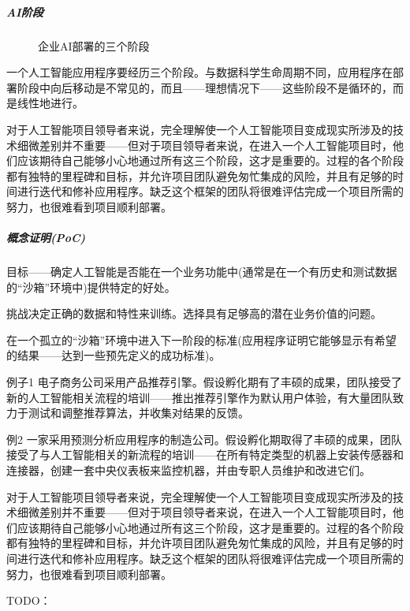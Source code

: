 \documentclass[letterpaper,10pt,english]{sphinxmanual}
\begin{document}
\subparagraph{AI阶段}
\label{\detokenize{chapter_knowledge/project_manage:id17}}
\begin{figure}[H]
\centering
\capstart

\noindent{}
\caption{企业AI部署的三个阶段}\label{\detokenize{chapter_knowledge/project_manage:id23}}\end{figure}

一个人工智能应用程序要经历三个阶段。与数据科学生命周期不同，应用程序在部署阶段中向后移动是不常见的，而且——理想情况下——这些阶段不是循环的，而是线性地进行。

对于人工智能项目领导者来说，完全理解使一个人工智能项目变成现实所涉及的技术细微差别并不重要——但对于项目领导者来说，在进入一个人工智能项目时，他们应该期待自己能够小心地通过所有这三个阶段，这才是重要的。过程的各个阶段都有独特的里程碑和目标，并允许项目团队避免匆忙集成的风险，并且有足够的时间进行迭代和修补应用程序。缺乏这个框架的团队将很难评估完成一个项目所需的努力，也很难看到项目顺利部署。


\subparagraph{概念证明(PoC)}
\label{\detokenize{chapter_knowledge/project_manage:poc}}
目标——确定人工智能是否能在一个业务功能中(通常是在一个有历史和测试数据的“沙箱”环境中)提供特定的好处。

挑战\sphinxhyphen{}决定正确的数据和特性来训练。选择具有足够高的潜在业务价值的问题。

在一个孤立的“沙箱”环境中进入下一阶段的标准(应用程序证明它能够显示有希望的结果——达到一些预先定义的成功标准)。

例子1
\sphinxhyphen{}电子商务公司采用产品推荐引擎。假设孵化期有了丰硕的成果，团队接受了新的人工智能相关流程的培训——推出推荐引擎作为默认用户体验，有大量团队致力于测试和调整推荐算法，并收集对结果的反馈。

例2
\sphinxhyphen{}一家采用预测分析应用程序的制造公司。假设孵化期取得了丰硕的成果，团队接受了与人工智能相关的新流程的培训——在所有特定类型的机器上安装传感器和连接器，创建一套中央仪表板来监控机器，并由专职人员维护和改进它们。

对于人工智能项目领导者来说，完全理解使一个人工智能项目变成现实所涉及的技术细微差别并不重要——但对于项目领导者来说，在进入一个人工智能项目时，他们应该期待自己能够小心地通过所有这三个阶段，这才是重要的。过程的各个阶段都有独特的里程碑和目标，并允许项目团队避免匆忙集成的风险，并且有足够的时间进行迭代和修补应用程序。缺乏这个框架的团队将很难评估完成一个项目所需的努力，也很难看到项目顺利部署。

TODO：
\end{document}
